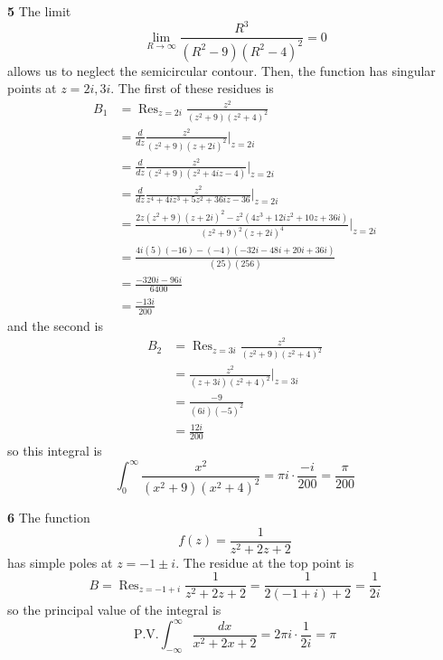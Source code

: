 \documentclass{article}
\DeclareMathOperator{\Res}{Res}
\begin{document}
\textbf{5}
The limit
\[
	\lim_{R \to \infty} \frac{R^3}{(R^2 - 9)(R^2 - 4)^2} = 0
\]
allows us to neglect the semicircular contour. Then, the function has singular points at $z = 2i, 3i$. The first of these residues is
\begin{align*}
	B_1
	&= \Res_{z = 2i} \frac{z^2}{(z^2 + 9)(z^2 + 4)^2} \\
	&= \frac{d}{dz} \frac{z^2}{(z^2 + 9)(z + 2i)^2} \Big|_{z = 2i} \\
	&= \frac{d}{dz} \frac{z^2}{(z^2 + 9)(z^2 + 4iz - 4)}  \Big|_{z = 2i} \\
	&= \frac{d}{dz} \frac{z^2}{z^4 + 4iz^3 + 5z^2 + 36iz - 36} \Big|_{z = 2i} \\
	&= \frac{2z(z^2 + 9)(z + 2i)^2 - z^2(4z^3 + 12iz^2 + 10z + 36i)}
		{(z^2 + 9)^2(z + 2i)^4} \Big|_{z = 2i} \\
	&= \frac{4i(5)(-16) - (-4)(-32i - 48i + 20i + 36i)}{(25)(256)} \\
	&= \frac{-320i - 96i}{6400} \\
	&= \frac{-13i}{200}
\end{align*}
and the second is
\begin{align*}
	B_2
	&= \Res_{z = 3i} \frac{z^2}{(z^2 + 9)(z^2 + 4)^2} \\
	&= \frac{z^2}{(z + 3i)(z^2 + 4)^2} \Big|_{z = 3i} \\
	&= \frac{-9}{(6i)(-5)^2} \\
	&= \frac{12i}{200}
\end{align*}
so this integral is
\[
	\int_0^\infty \frac{x^2}{(x^2 + 9)(x^2 + 4)^2}
	= \pi i \cdot \frac{-i}{200}
	= \frac{\pi}{200}
\]

\textbf{6}
The function
\[
	f(z) = \frac{1}{z^2 + 2z + 2}
\]
has simple poles at $z = -1 \pm i$. The residue at the top point is
\[
	B
	= \Res_{z = -1+i} \frac{1}{z^2 + 2z + 2}
	= \frac{1}{2(-1 + i) + 2} 
	= \frac{1}{2i}
\]
so the principal value of the integral is
\[
	\text{P.V.} \int_{-\infty}^\infty \frac{dx}{x^2 + 2x + 2}
	= 2\pi i \cdot \frac{1}{2i}
	= \pi
\]
\end{document}
